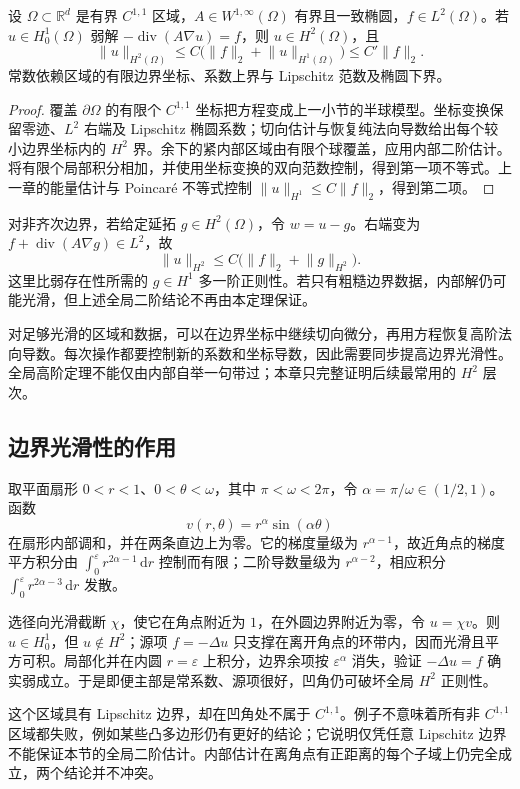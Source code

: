\begin{theorem}
\label{b2:thm:16-boundary-h2}
设 \(\Omega\subset\mathbb R^d\) 是有界 \(C^{1,1}\) 区域，\(A\in W^{1,\infty}(\Omega)\) 有界且一致椭圆，\(f\in L^2(\Omega)\)。若 \(u\in H_0^1(\Omega)\) 弱解 \(-\operatorname{div}(A\nabla u)=f\)，则 \(u\in H^2(\Omega)\)，且
\[\lVert u\rVert_{H^2(\Omega)}\le C\bigl(\lVert f\rVert_2+\lVert u\rVert_{H^1(\Omega)}\bigr)\le C'\lVert f\rVert_2.\]
常数依赖区域的有限边界坐标、系数上界与 Lipschitz 范数及椭圆下界。
\end{theorem}
\begin{proof}
覆盖 \(\partial\Omega\) 的有限个 \(C^{1,1}\) 坐标把方程变成上一小节的半球模型。坐标变换保留零迹、\(L^2\) 右端及 Lipschitz 椭圆系数；切向估计与恢复纯法向导数给出每个较小边界坐标内的 \(H^2\) 界。余下的紧内部区域由有限个球覆盖，应用内部二阶估计。将有限个局部积分相加，并使用坐标变换的双向范数控制，得到第一项不等式。上一章的能量估计与 Poincaré 不等式控制 \(\lVert u\rVert_{H^1}\le C\lVert f\rVert_2\)，得到第二项。
\end{proof}

对非齐次边界，若给定延拓 \(g\in H^2(\Omega)\)，令 \(w=u-g\)。右端变为 \(f+\operatorname{div}(A\nabla g)\in L^2\)，故
\[\lVert u\rVert_{H^2}\le C\bigl(\lVert f\rVert_2+\lVert g\rVert_{H^2}\bigr).\]
这里比弱存在性所需的 \(g\in H^1\) 多一阶正则性。若只有粗糙边界数据，内部解仍可能光滑，但上述全局二阶结论不再由本定理保证。

\ProseParagraphBreak

对足够光滑的区域和数据，可以在边界坐标中继续切向微分，再用方程恢复高阶法向导数。每次操作都要控制新的系数和坐标导数，因此需要同步提高边界光滑性。全局高阶定理不能仅由内部自举一句带过；本章只完整证明后续最常用的 \(H^2\) 层次。

\subsection{边界光滑性的作用}
\label{b2:subsec:160304}

取平面扇形 \(0<r<1\)、\(0<\theta<\omega\)，其中 \(\pi<\omega<2\pi\)，令 \(\alpha=\pi/\omega\in(1/2,1)\)。函数
\[v(r,\theta)=r^\alpha\sin(\alpha\theta)\]
在扇形内部调和，并在两条直边上为零。它的梯度量级为 \(r^{\alpha-1}\)，故近角点的梯度平方积分由 \(\int_0^\varepsilon r^{2\alpha-1}\,\mathrm dr\) 控制而有限；二阶导数量级为 \(r^{\alpha-2}\)，相应积分 \(\int_0^\varepsilon r^{2\alpha-3}\,\mathrm dr\) 发散。

\ProseParagraphBreak

选径向光滑截断 \(\chi\)，使它在角点附近为 \(1\)，在外圆边界附近为零，令 \(u=\chi v\)。则 \(u\in H_0^1\)，但 \(u\notin H^2\)；源项 \(f=-\Delta u\) 只支撑在离开角点的环带内，因而光滑且平方可积。局部化并在内圆 \(r=\varepsilon\) 上积分，边界余项按 \(\varepsilon^\alpha\) 消失，验证 \(-\Delta u=f\) 确实弱成立。于是即便主部是常系数、源项很好，凹角仍可破坏全局 \(H^2\) 正则性。

\ProseParagraphBreak

这个区域具有 Lipschitz 边界，却在凹角处不属于 \(C^{1,1}\)。例子不意味着所有非 \(C^{1,1}\) 区域都失败，例如某些凸多边形仍有更好的结论；它说明仅凭任意 Lipschitz 边界不能保证本节的全局二阶估计。内部估计在离角点有正距离的每个子域上仍完全成立，两个结论并不冲突。

